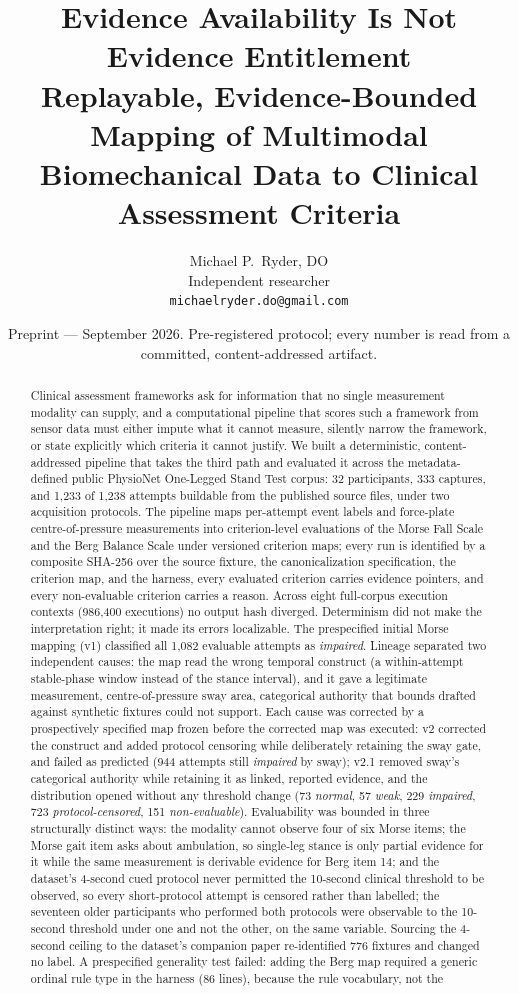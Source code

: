 \documentclass[11pt]{article}
\title{\textbf{Evidence Availability Is Not Evidence Entitlement}\\[4pt]
\large Replayable, Evidence-Bounded Mapping of Multimodal Biomechanical Data to Clinical Assessment Criteria}
\author{Michael P.\ Ryder, DO\\ \small Independent researcher \\ \small \texttt{michaelryder.do@gmail.com}}
\date{\small Preprint --- September 2026. Pre-registered protocol; every number is read from a committed, content-addressed artifact.}
\begin{document}
\maketitle
\begin{abstract}
\noindent Clinical assessment frameworks ask for information that no single measurement modality can supply, and a computational pipeline that scores such a framework from sensor data must either impute what it cannot measure, silently narrow the framework, or state explicitly which criteria it cannot justify. We built a deterministic, content-addressed pipeline that takes the third path and evaluated it across the metadata-defined public PhysioNet One-Legged Stand Test corpus: 32 participants, 333 captures, and 1,233 of 1,238 attempts buildable from the published source files, under two acquisition protocols. The pipeline maps per-attempt event labels and force-plate centre-of-pressure measurements into criterion-level evaluations of the Morse Fall Scale and the Berg Balance Scale under versioned criterion maps; every run is identified by a composite SHA-256 over the source fixture, the canonicalization specification, the criterion map, and the harness, every evaluated criterion carries evidence pointers, and every non-evaluable criterion carries a reason. Across eight full-corpus execution contexts (986,400 executions) no output hash diverged. Determinism did not make the interpretation right; it made its errors localizable. The prespecified initial Morse mapping (v1) classified all 1,082 evaluable attempts as \emph{impaired}. Lineage separated two independent causes: the map read the wrong temporal construct (a within-attempt stable-phase window instead of the stance interval), and it gave a legitimate measurement, centre-of-pressure sway area, categorical authority that bounds drafted against synthetic fixtures could not support. Each cause was corrected by a prospectively specified map frozen before the corrected map was executed: v2 corrected the construct and added protocol censoring while deliberately retaining the sway gate, and failed as predicted (944 attempts still \emph{impaired} by sway); v2.1 removed sway's categorical authority while retaining it as linked, reported evidence, and the distribution opened without any threshold change (73 \emph{normal}, 57 \emph{weak}, 229 \emph{impaired}, 723 \emph{protocol-censored}, 151 \emph{non-evaluable}). Evaluability was bounded in three structurally distinct ways: the modality cannot observe four of six Morse items; the Morse gait item asks about ambulation, so single-leg stance is only partial evidence for it while the same measurement is derivable evidence for Berg item 14; and the dataset's 4-second cued protocol never permitted the 10-second clinical threshold to be observed, so every short-protocol attempt is censored rather than labelled; the seventeen older participants who performed both protocols were observable to the 10-second threshold under one and not the other, on the same variable. Sourcing the 4-second ceiling to the dataset's companion paper re-identified 776 fixtures and changed no label. A prespecified generality test failed: adding the Berg map required a generic ordinal rule type in the harness (86 lines), because the rule vocabulary, not the 
\end{abstract}
\end{document}
